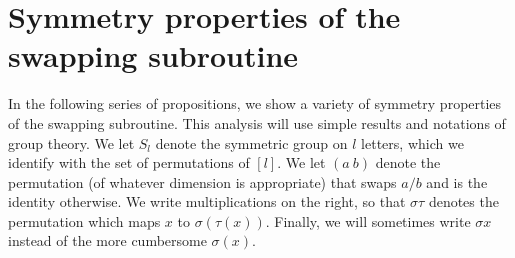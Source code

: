 \section{Symmetry properties of the swapping subroutine}
\label{symmetry-sec}
In the following series of propositions, we show a variety of symmetry properties of the swapping subroutine. This analysis will use simple results and notations of group theory. We let $S_l$ denote the symmetric group on $l$ letters, which we identify with the set of permutations of $[l]$. We let $(a \ b)$ denote the permutation (of whatever dimension is appropriate) that swaps $a/b$ and is the identity otherwise. We write multiplications on the right, so that $\sigma \tau$ denotes the permutation which maps $x$ to $\sigma(\tau(x))$. Finally, we will sometimes write $\sigma x$ instead of the more cumbersome $\sigma(x)$.


